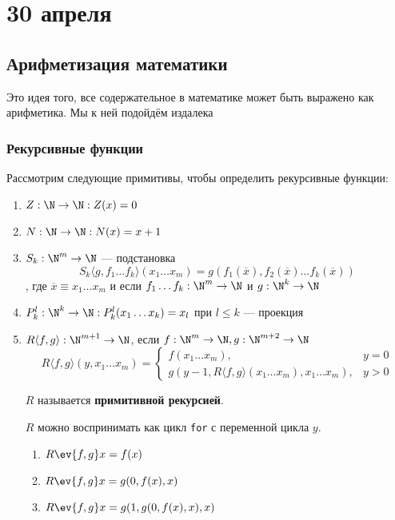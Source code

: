\chapter{30 апреля}

\section{Арифметизация математики}

Это идея того, все содержательное в математике может быть выражено как арифметика. Мы к ней подойдём издалека

\subsection{Рекурсивные функции}

Рассмотрим следующие примитивы, чтобы определить рекурсивные функции:
\begin{enumerate}
    \item \(Z : \N \to \N : Z(x) = 0\)
    \item \(N : \N \to \N : N(x) = x + 1\)
    \item \(S_k : \N^m \to \N\) --- подстановка
          \[S_k \langle g, f_1 \dots f_k \rangle(x_1 \dots x_m) = g(f_1(\overline{x}), f_2(\overline{x}) \dots f_k(\overline x))\], где \(\overline x \equiv x_1 \dots x_m\) и если \(f_1 \dots f_k : \N^m \to \N\) и \(g : \N^k \to \N\)
    \item \(P_k^l : \N^k \to \N : P_k^l(x_1 \dots x_k) = x_l\) при \(l \leq k\) --- проекция
    \item \(R\langle f, g \rangle : \N^{m + 1} \to \N\), если \(f : \N^m \to \N, g : \N^{m + 2} \to \N\)
          \[R \langle f, g \rangle (y, x_1 \dots x_m) = \begin{cases}
                  f(x_1 \dots x_m),                                               & y = 0 \\
                  g(y - 1, R \langle f, g \rangle(x_1 \dots x_m), x_1 \dots x_m), & y > 0
              \end{cases} \]

          \(R\) называется \textbf{примитивной рекурсией}.

          \(R\) можно воспринимать как цикл \texttt{for} с переменной цикла \(y\).

          \begin{example}\itemfix
              \begin{enumerate}
                  \item \(R\ev{f,g} x = f(x)\)
                  \item \(R\ev{f,g} x = g(0, f(x), x)\)
                  \item \(R\ev{f,g} x = g(1, g(0, f(x), x), x)\)
              \end{enumerate}
          \end{example}
\end{enumerate}

